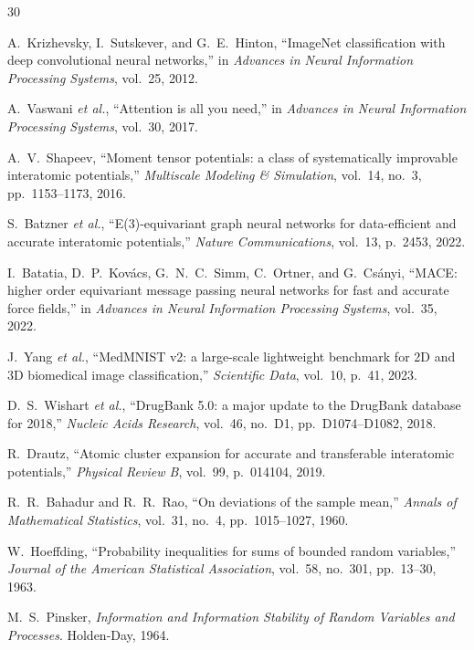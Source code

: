 \documentclass[12pt,a4paper]{article}
\begin{document}
\begin{thebibliography}{30}

A.~Krizhevsky, I.~Sutskever, and G.~E.~Hinton, ``ImageNet classification with deep convolutional neural networks,'' in \textit{Advances in Neural Information Processing Systems}, vol.~25, 2012.

A.~Vaswani \textit{et al.}, ``Attention is all you need,'' in \textit{Advances in Neural Information Processing Systems}, vol.~30, 2017.

A.~V.~Shapeev, ``Moment tensor potentials: a class of systematically improvable interatomic potentials,'' \textit{Multiscale Modeling \& Simulation}, vol.~14, no.~3, pp.~1153--1173, 2016.

S.~Batzner \textit{et al.}, ``E(3)-equivariant graph neural networks for data-efficient and accurate interatomic potentials,'' \textit{Nature Communications}, vol.~13, p.~2453, 2022.

I.~Batatia, D.~P.~Kov\'acs, G.~N.~C.~Simm, C.~Ortner, and G.~Cs\'anyi, ``MACE: higher order equivariant message passing neural networks for fast and accurate force fields,'' in \textit{Advances in Neural Information Processing Systems}, vol.~35, 2022.

J.~Yang \textit{et al.}, ``MedMNIST v2: a large-scale lightweight benchmark for 2D and 3D biomedical image classification,'' \textit{Scientific Data}, vol.~10, p.~41, 2023.

D.~S.~Wishart \textit{et al.}, ``DrugBank 5.0: a major update to the DrugBank database for 2018,'' \textit{Nucleic Acids Research}, vol.~46, no.~D1, pp.~D1074--D1082, 2018.

R.~Drautz, ``Atomic cluster expansion for accurate and transferable interatomic potentials,'' \textit{Physical Review B}, vol.~99, p.~014104, 2019.

R.~R.~Bahadur and R.~R.~Rao, ``On deviations of the sample mean,'' \textit{Annals of Mathematical Statistics}, vol.~31, no.~4, pp.~1015--1027, 1960.

W.~Hoeffding, ``Probability inequalities for sums of bounded random variables,'' \textit{Journal of the American Statistical Association}, vol.~58, no.~301, pp.~13--30, 1963.

M.~S.~Pinsker, \textit{Information and Information Stability of Random Variables and Processes}. Holden-Day, 1964.

\end{thebibliography}
\end{document}

